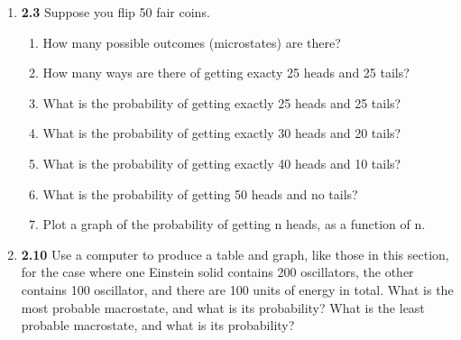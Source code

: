 \documentclass[fleqn]{article}
\begin{document}
\begin{enumerate}
\begin{enumerate}
    \end{enumerate}

    \pagebreak

    \item \textbf{2.3} Suppose you flip 50 fair coins.
    \begin{enumerate}
      \item How many possible outcomes (microstates) are there?


      \item How many ways are there of getting exacty 25 heads and 25 tails?


      \item What is the probability of getting exactly 25 heads and 25 tails?


      \item What is the probability of getting exactly 30 heads and 20 tails?
      

      \item What is the probability of getting exactly 40 heads and 10 tails?


      \item What is the probability of getting 50 heads and no tails?


      \item Plot a graph of the probability of getting n heads, as a function of n.


    \end{enumerate}

    \item \textbf{2.10} Use a computer to produce a table and graph, like those in this section, for the case
    where one Einstein solid contains 200 oscillators, the other contains 100 oscillator, and there are 
    100 units of energy in total. What is the most probable macrostate, and what is its probability? What
    is the least probable macrostate, and what is its probability?


  \end{enumerate}
\end{document}
